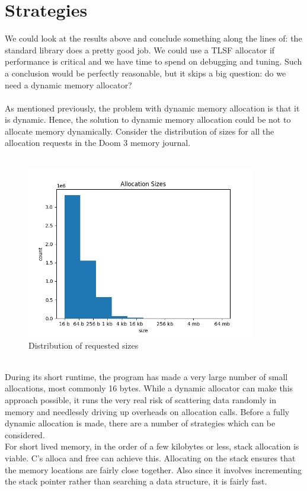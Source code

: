 \documentclass{article}
\begin{document}
\section{Strategies}
We could look at the results above and conclude something along the lines of: the standard library does a pretty good job. We could use a TLSF allocator if performance is critical and we have time to spend on debugging and tuning. Such a conclusion would be perfectly reasonable, but it skips a big question: do we need a dynamic memory allocator?\\
\\
As mentioned previously, the problem with dynamic memory allocation is that it is dynamic. Hence, the solution to dynamic memory allocation could be not to allocate memory dynamically. Consider the distribution of sizes for all the allocation requests in the Doom 3 memory journal.\\
\\
\begin{figure}[h]
	\centering
	\includegraphics[width=10cm]{size_distribution}
	\captionsetup{width=10cm}
	\caption{Distribution of requested sizes}
\end{figure}
\\
During its short runtime, the program has made a very large number of small allocations, most commonly 16 bytes. While a dynamic allocator can make this approach possible, it runs the very real risk of scattering data randomly in memory and needlessly driving up overheads on allocation calls. Before a fully dynamic allocation is made, there are a number of strategies which can be considered.\\
For short lived memory, in the order of a few kilobytes or less, stack allocation is viable. C's alloca and free can achieve this. Allocating on the stack ensures that the memory locations are fairly close together. Also since it involves incrementing the stack pointer rather than searching a data structure, it is fairly fast.\\
\end{document}
